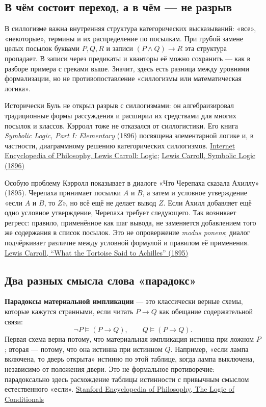 \documentclass[12pt,a4paper]{article}
\begin{document}
\subsection{В чём состоит переход, а в чём — не разрыв}

В силлогизме важна внутренняя структура категорических высказываний: «все», «некоторые», термины и их распределение по посылкам. При грубой замене целых посылок буквами \(P,Q,R\) и записи \((P\land Q)\to R\) эта структура пропадает. В записи через предикаты и кванторы её можно сохранить — как в разборе примера с греками выше. Значит, здесь есть разница между уровнями формализации, но не противопоставление «силлогизмы или математическая логика».

Исторически Буль не открыл разрыв с силлогизмами: он алгебраизировал традиционные формы рассуждения и расширил их средствами для многих посылок и классов. Кэрролл тоже не отказался от силлогистики. Его книга \emph{Symbolic Logic, Part I: Elementary} (1896) посвящена элементарной логике и, в частности, диаграммному решению категорических силлогизмов. \href{https://iep.utm.edu/lewis-carroll-logic/}{Internet Encyclopedia of Philosophy, Lewis Carroll: Logic}; \href{https://archive.org/details/symboliclogicpa00carrgoog}{Lewis Carroll, Symbolic Logic (1896)}

Особую проблему Кэрролл показывает в диалоге «Что Черепаха сказала Ахиллу» (1895). Черепаха принимает посылки \(A\) и \(B\), а затем и условное утверждение «если \(A\) и \(B\), то \(Z\)», но всё ещё не делает вывод \(Z\). Если Ахилл добавляет ещё одно условное утверждение, Черепаха требует следующего. Так возникает регресс: правило, применённое как шаг вывода, не заменяется добавлением того же содержания в список посылок. Это не опровержение \emph{modus ponens}; диалог подчёркивает различие между условной формулой и правилом её применения. \href{https://fair-use.org/mind/1895/04/what-the-tortoise-said-to-achilles}{Lewis Carroll, “What the Tortoise Said to Achilles” (1895)}

\subsection{Два разных смысла слова «парадокс»}

\textbf{Парадоксы материальной импликации} — это классически верные схемы, которые кажутся странными, если читать \(P\to Q\) как обещание содержательной связи:
\[
\neg P \models (P\to Q), \qquad Q \models (P\to Q).
\]
Первая схема верна потому, что материальная импликация истинна при ложном \(P\); вторая — потому, что она истинна при истинном \(Q\). Например, «если лампа включена, то дверь открыта» истинно по этой таблице, когда лампа выключена, независимо от положения двери. Это не формальное противоречие: парадоксально здесь расхождение таблицы истинности с привычным смыслом естественного «если». \href{https://plato.stanford.edu/entries/logic-conditionals/}{Stanford Encyclopedia of Philosophy, The Logic of Conditionals}
\end{document}
